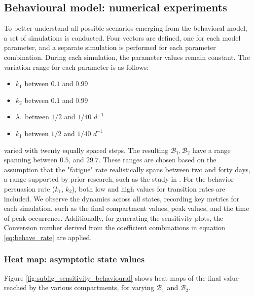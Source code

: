 \subsection{Behavioural model: numerical experiments}
To better understand all possible scenarios emerging from the behavioral model, a set of simulations is conducted. Four vectors are defined, one for each model parameter, and a separate simulation is performed for each parameter combination. During each simulation, the parameter values remain constant. The variation range for each parameter is as follows:
\begin{itemize}
	\item $k_1$ between $0.1$ and $0.99$
	\item $k_2$ between $0.1$ and $0.99$
	\item $\lambda_1$ between $1/2$ and $1/40$ $d^{-1}$
	\item $k_1$ between $1/2$ and $1/40$ $d^{-1}$
\end{itemize}
varied with twenty equally spaced steps.
The resulting $\mathcal{B}_1, \mathcal{B}_2$ have a range spanning between $0.5$, and $29.7$.
These ranges are chosen based on the assumption that the "fatigue" rate realistically spans between two and forty days, a range supported by prior research, such as the study in \cite{Kwasnicka_2016}. For the behavior persuasion rate ($k_1$, $k_2$), both low and high values for transition rates are included. We observe the dynamics across all states, recording key metrics for each simulation, such as the final compartment values, peak values, and the time of peak occurrence. Additionally, for generating the sensitivity plots, the Conversion number derived from the coefficient combinations in equation \eqref{eq:behave_rate} are applied. 

\subsubsection{Heat map: asymptotic state values}
Figure \ref{fig:subfig_sensitivity_behavioural} shows heat maps of the final value reached by the various compartments, for varying $\mathcal{B}_1$ and $\mathcal{B}_2$.

